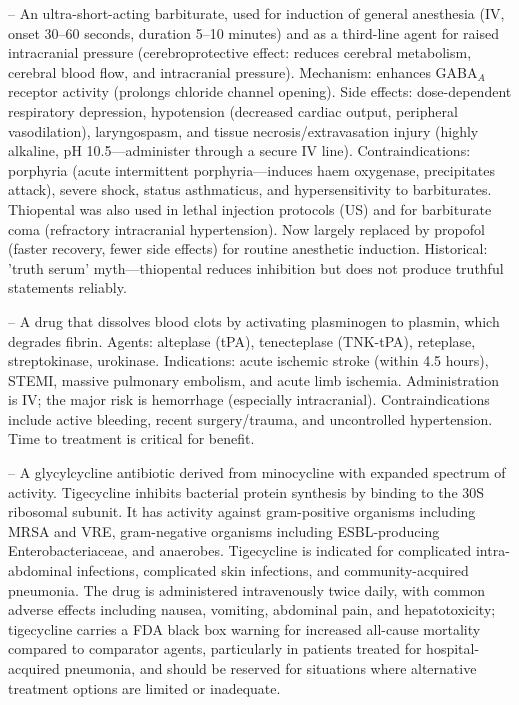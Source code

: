 -- An ultra-short-acting barbiturate, used for induction of general anesthesia (IV, onset 30--60 seconds, duration 5--10 minutes) and as a third-line agent for raised intracranial pressure (cerebroprotective effect: reduces cerebral metabolism, cerebral blood flow, and intracranial pressure). Mechanism: enhances GABA$_A$ receptor activity (prolongs chloride channel opening). Side effects: dose-dependent respiratory depression, hypotension (decreased cardiac output, peripheral vasodilation), laryngospasm, and tissue necrosis/extravasation injury (highly alkaline, pH 10.5—administer through a secure IV line). Contraindications: porphyria (acute intermittent porphyria—induces haem oxygenase, precipitates attack), severe shock, status asthmaticus, and hypersensitivity to barbiturates. Thiopental was also used in lethal injection protocols (US) and for barbiturate coma (refractory intracranial hypertension). Now largely replaced by propofol (faster recovery, fewer side effects) for routine anesthetic induction. Historical: 'truth serum' myth—thiopental reduces inhibition but does not produce truthful statements reliably.

-- A drug that dissolves blood clots by activating plasminogen to plasmin, which degrades fibrin. Agents: alteplase (tPA), tenecteplase (TNK-tPA), reteplase, streptokinase, urokinase. Indications: acute ischemic stroke (within 4.5 hours), STEMI, massive pulmonary embolism, and acute limb ischemia. Administration is IV; the major risk is hemorrhage (especially intracranial). Contraindications include active bleeding, recent surgery/trauma, and uncontrolled hypertension. Time to treatment is critical for benefit.

-- A glycylcycline antibiotic derived from minocycline with expanded spectrum of activity. Tigecycline inhibits bacterial protein synthesis by binding to the 30S ribosomal subunit. It has activity against gram-positive organisms including MRSA and VRE, gram-negative organisms including ESBL-producing Enterobacteriaceae, and anaerobes. Tigecycline is indicated for complicated intra-abdominal infections, complicated skin infections, and community-acquired pneumonia. The drug is administered intravenously twice daily, with common adverse effects including nausea, vomiting, abdominal pain, and hepatotoxicity; tigecycline carries a FDA black box warning for increased all-cause mortality compared to comparator agents, particularly in patients treated for hospital-acquired pneumonia, and should be reserved for situations where alternative treatment options are limited or inadequate.

